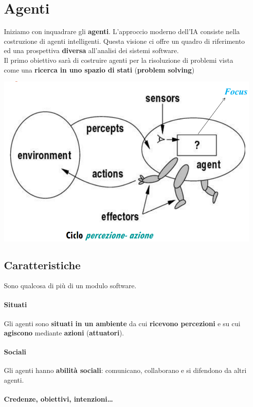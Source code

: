 \documentclass[10pt]{book}
\begin{document}
\section{Agenti}
Iniziamo con inquadrare gli \textbf{agenti}. L'approccio moderno dell'IA consiste nella costruzione di agenti intelligenti. Questa visione ci offre un quadro di riferimento ed una prospettiva \textbf{diversa} all'analisi dei sistemi software.\\
Il primo obiettivo sarà di costruire agenti per la risoluzione di problemi vista come una \textbf{ricerca in uno spazio di stati} (\textbf{problem solving})
\begin{center}
	\includegraphics[scale=0.7]{agenti.png}
\end{center}
\subsection{Caratteristiche}
Sono qualcosa di più di un modulo software.
\paragraph{Situati} Gli agenti sono \textbf{situati in un ambiente} da cui \textbf{ricevono percezioni} e su cui \textbf{agiscono} mediante \textbf{azioni} (\textbf{attuatori}).
\paragraph{Sociali} Gli agenti hanno \textbf{abilità sociali}: comunicano, collaborano e si difendono da altri agenti.
\paragraph{Credenze, obiettivi, intenzioni\ldots}
\end{document}
